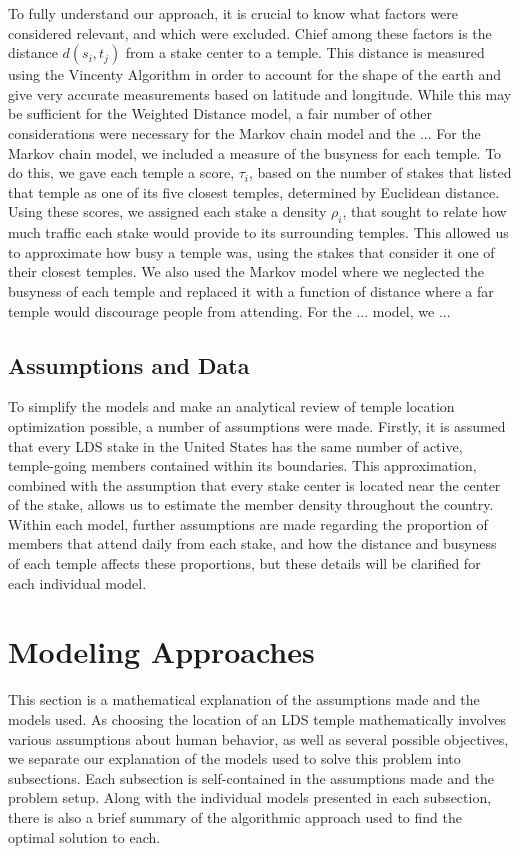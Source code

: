 \documentclass[twoside,twocolumn]{article}
\begin{document}
\noindent To fully understand our approach, it is crucial to know what factors were considered relevant, and which were excluded. %
Chief among these factors is the distance $d(s_{i},t_{j})$ from a stake center to a temple.
This distance is measured using the Vincenty Algorithm in order to account for the shape of the earth and give very accurate measurements based on latitude and longitude.
While this may be sufficient for the Weighted Distance model, a fair number of other considerations were necessary for the Markov chain model and the ...
For the Markov chain model, we included a measure of the busyness for each temple.
To do this, we gave each temple a score, $\tau_{i}$, based on the number of stakes that listed that temple as one of its five closest temples, determined by Euclidean distance.
Using these scores, we assigned each stake a density $\rho_{i}$, that sought to relate how much traffic each stake would provide to its surrounding temples.
This allowed us to approximate how busy a temple was, using the stakes that consider it one of their closest temples.
We also used the Markov model where we neglected the busyness of each temple and replaced it with a function of distance where a far temple would discourage people from attending. %
For the ... model, we ...

\subsection{Assumptions and Data}
To simplify the models and make an analytical review of temple location optimization possible, a number of assumptions were made.
Firstly, it is assumed that every LDS stake in the United States has the same number of active, temple-going members contained within its boundaries.
This approximation, combined with the assumption that every stake center is located near the center of the stake, allows us to estimate the member density throughout the country.
Within each model, further assumptions are made regarding the proportion of members that attend daily from each stake, and how the distance and busyness of each temple affects these proportions, but these details will be clarified for each individual model.

\section{Modeling Approaches}
\label{sec:models}
This section is a mathematical explanation of the assumptions made and the models used.
As choosing the location of an LDS temple mathematically involves various assumptions about human behavior, as well as several possible objectives, we separate our explanation of the models used to solve this problem into subsections. %
Each subsection is self-contained in the assumptions made and the problem setup.
Along with the individual models presented in each subsection, there is also a brief summary of the algorithmic approach used to find the optimal solution to each.
\end{document}
